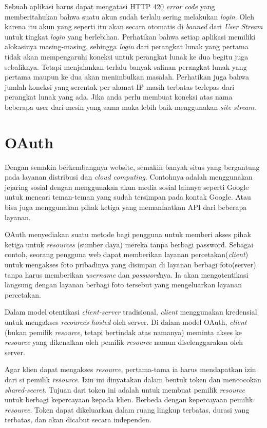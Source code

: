 Sebuah aplikasi harus dapat mengatasi HTTP 420 \textit{error code} yang memberitahukan bahwa suatu akun sudah terlalu sering melakukan \textit{login}. Oleh karena itu akun yang seperti itu akan secara otomatis di \textit{banned} dari \textit{User Stream} untuk tingkat \textit{login} yang berlebihan. Perhatikan bahwa setiap aplikasi memiliki alokasinya masing-masing, sehingga \textit{login} dari perangkat lunak yang pertama tidak akan mempengaruhi koneksi untuk perangkat lunak ke dua begitu juga sebaliknya. Tetapi menjalankan terlalu banyak salinan perangkat lunak yang pertama maupun ke dua akan menimbulkan masalah. Perhatikan juga bahwa jumlah koneksi yang serentak per alamat IP masih terbatas terlepas dari perangkat lunak yang ada. Jika anda perlu membuat koneksi atas nama beberapa user dari mesin yang sama maka lebih baik menggunakan \textit{site stream}.

\section{OAuth}
\label{sec:oauth}
Dengan semakin berkembangnya website, semakin banyak situs yang bergantung pada layanan distribusi dan \textit{cloud computing}. Contohnya adalah menggunakan jejaring sosial dengan menggunakan akun media sosial lainnya seperti Google untuk mencari teman-teman yang sudah tersimpan pada kontak Google. Atau bisa juga menggunakan pihak ketiga yang memanfaatkan API dari beberapa layanan.

OAuth menyediakan suatu metode bagi pengguna untuk memberi akses pihak ketiga untuk \textit{resources} (sumber daya) mereka tanpa berbagi password. Sebagai contoh, seorang pengguna web dapat memberikan layanan percetakan(\textit{client}) untuk mengakses foto pribadinya yang disimpan di layanan berbagi foto(server) tanpa harus memberikan \textit{username} dan \textit{password}nya. Ia akan mengotentikasi langsung dengan layanan berbagi foto tersebut yang mengeluarkan layanan percetakan.

Dalam model otentikasi \textit{client-server} tradisional, \textit{client} menggunakan kredensial untuk mengakses \textit{recources hosted} oleh server. Di dalam model OAuth, \textit{client} (bukan pemilik \textit{resource}, tetapi bertindak atas namanya) meminta akses ke \textit{resource} yang dikenalkan oleh pemilik \textit{resource} namun diselenggarakan oleh server.

Agar klien dapat mengakses \textit{resource}, pertama-tama ia harus mendapatkan izin dari si pemilik \textit{resource}. Izin ini dinyatakan dalam bentuk token dan mencocokan \textit{shared-secret}. Tujuan dari token ini adalah untuk membuat pemilik \textit{resource} untuk berbagi kepercayaan kepada klien. Berbeda dengan kepercayaan pemilik \textit{resource}. Token dapat dikeluarkan dalam ruang lingkup terbatas, durasi yang terbatas, dan akan dicabut secara independen.

